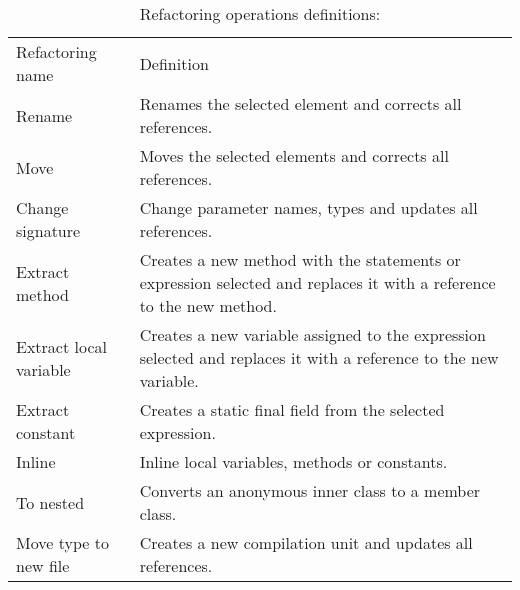 \begin{table}[htbp]
\caption{Refactoring operations definitions:}
\label{tab-Refactoring-Definitions}
\begin{tabular}{ |p{2.95cm}| p{9.15cm}|}
\hline\noalign{\smallskip}
Refactoring name 		  & Definition \\
\noalign{\smallskip}
\hline
\noalign{\smallskip}
Rename                    & Renames the selected element and corrects all references.                                                                                                                 \\ \hline
Move                      & Moves the selected elements and corrects all references.                                                                                                                  \\ \hline
Change signature          & Change parameter names, types and updates all references.                                                                                                                 \\ \hline
Extract method            & Creates a new method with the statements or expression selected and replaces it with a reference to the new method.                                                          \\ \hline
Extract local variable    & Creates a new variable assigned to the expression selected and replaces it with a reference to the new variable.                                                             \\ \hline
Extract constant          & Creates a static final field from the selected expression.                                                                                                                \\ \hline
Inline                    & Inline local variables, methods or constants.                                                                                                                             \\ \hline
To nested                 & Converts an anonymous inner class to a member class.                                                                                                                      \\ \hline
Move type to new file     & Creates a new compilation unit and updates all references.                                                                                                                \\ \hline

\end{tabular}
\end{table}
